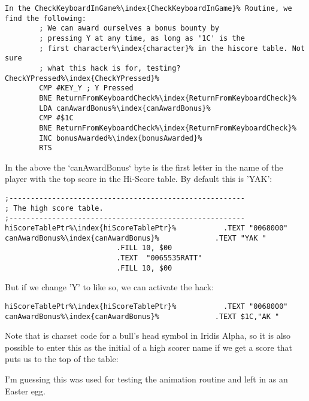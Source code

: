 \begin{definition}
\setlength{\intextsep}{0pt}%
\setlength{\columnsep}{3pt}%
\small
\begin{lstlisting}[basicstyle=\tiny,escapechar=\%]
In the CheckKeyboardInGame%\index{CheckKeyboardInGame}% Routine, we find the following:
        ; We can award ourselves a bonus bounty by
        ; pressing Y at any time, as long as '1C' is the
        ; first character%\index{character}% in the hiscore table. Not sure
        ; what this hack is for, testing?
CheckYPressed%\index{CheckYPressed}%   
        CMP #KEY_Y ; Y Pressed
        BNE ReturnFromKeyboardCheck%\index{ReturnFromKeyboardCheck}%
        LDA canAwardBonus%\index{canAwardBonus}%
        CMP #$1C
        BNE ReturnFromKeyboardCheck%\index{ReturnFromKeyboardCheck}%
        INC bonusAwarded%\index{bonusAwarded}%
        RTS
\end{lstlisting}

In the above the `canAwardBonus` byte is the first letter in the name of the player with the top score in the Hi-Score table. By default this is 'YAK':

\begin{lstlisting}[basicstyle=\tiny,escapechar=\%]
;-------------------------------------------------------
; The high score table.
;-------------------------------------------------------
hiScoreTablePtr%\index{hiScoreTablePtr}%           .TEXT "0068000"
canAwardBonus%\index{canAwardBonus}%             .TEXT "YAK "
                          .FILL 10, $00
                          .TEXT  "0065535RATT"
                          .FILL 10, $00
\end{lstlisting}
But if we change 'Y' to  like so, we can activate the hack:

\begin{lstlisting}[basicstyle=\tiny,escapechar=\%]
hiScoreTablePtr%\index{hiScoreTablePtr}%           .TEXT "0068000"
canAwardBonus%\index{canAwardBonus}%             .TEXT $1C,"AK "
\end{lstlisting}

Note that  is charset code for a bull's head symbol in Iridis Alpha, so it is also possible to enter this as the initial of a high scorer name if we get a score that puts us to the top of the table:

%



I'm guessing this was used for testing the animation routine and left in as an Easter egg.
\end{definition}

